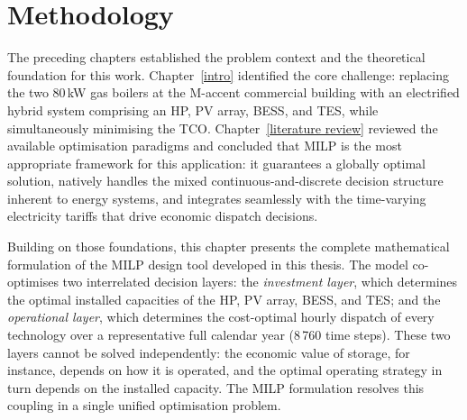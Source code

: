 \documentclass[11pt,a4paper]{report}
\begin{document}

\chapter{Methodology}
\label{chapt3}

The preceding chapters established the problem context and the theoretical foundation for this work.
Chapter~\ref{intro} identified the core challenge: replacing the two 80\,kW gas boilers at the M-accent commercial building with an electrified hybrid system comprising an HP, PV array, BESS, and TES, while simultaneously minimising the TCO.
Chapter~\ref{literature review} reviewed the available optimisation paradigms and concluded that MILP is the most appropriate framework for this application: it guarantees a globally optimal solution, natively handles the mixed continuous-and-discrete decision structure inherent to energy systems, and integrates seamlessly with the time-varying electricity tariffs that drive economic dispatch decisions.

Building on those foundations, this chapter presents the complete mathematical formulation of the MILP design tool developed in this thesis.
The model co-optimises two interrelated decision layers: the \textit{investment layer}, which determines the optimal installed capacities of the HP, PV array, BESS, and TES; and the \textit{operational layer}, which determines the cost-optimal hourly dispatch of every technology over a representative full calendar year (8\,760 time steps).
These two layers cannot be solved independently: the economic value of storage, for instance, depends on how it is operated, and the optimal operating strategy in turn depends on the installed capacity.
The MILP formulation resolves this coupling in a single unified optimisation problem.
\end{document}
